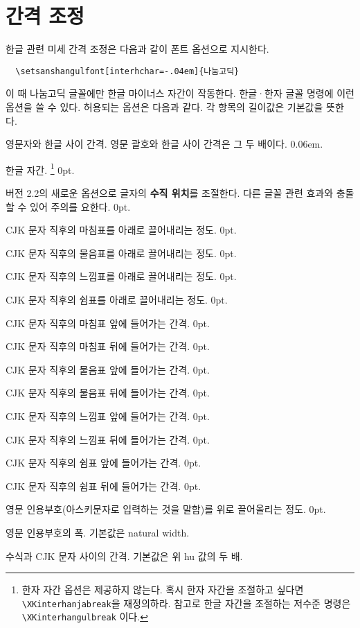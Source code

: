 \documentclass[a4paper]{article}
\def\cs#1{\texttt{\textbackslash #1}}
\def\hemph#1{\textsf{\bfseries #1}}
\def\hparen#1{{\small\hangulparens(#1)}}
\begin{document}
\section{간격 조정}
한글 관련 미세 간격 조정은 다음과 같이 폰트 옵션으로 지시한다.
\begin{verbatim}
  \setsanshangulfont[interhchar=-.04em]{나눔고딕}
\end{verbatim}
이 때 나눔고딕 글꼴에만 한글 마이너스 자간이 작동한다.
 한글·한자 글꼴
명령에 이런 옵션을 쓸 수 있다.
허용되는 옵션은 다음과 같다. 각 항목의 길이값은 기본값을 뜻한다.
\begin{description}\itemsep0pt
\item[hu]
  영문자와 한글 사이 간격. 영문 괄호와 한글 사이 간격은 그 두 배이다. 0.06em.
\item[interhchar]
  { 한글 자간.}%
  \footnote{한자 자간 옵션은 제공하지 않는다.
  혹시 한자 자간을 조절하고 싶다면 \cs{XKinterhanjabreak}을 재정의하라.
  참고로 한글 자간을 조절하는 저수준 명령은 \cs{XKinterhangulbreak} 이다.}
  0pt.
\item[charraise] 버전 2.2의 새로운 옵션으로
  글자의 \hemph{수직 위치}를 조절한다.
  다른 글꼴 관련 효과와 충돌할 수 있어 주의를 요한다. 0pt.
\item[lowerperiod]
  CJK 문자 직후의 마침표를 아래로 끌어내리는
  {정도. 0pt.}
\item[lowerquestion]
  CJK 문자 직후의 물음표를 아래로 끌어내리는 정도. 0pt.
\item[lowerexclamation]
  CJK 문자 직후의 느낌표를 아래로 끌어내리는 정도. 0pt.
\item[lowercomma]
  CJK 문자 직후의 쉼표를 아래로 끌어내리는 정도. 0pt.
\item[preperiodkern]
  {CJK 문자 직후의 마침표 앞에
  들어가는 간격. 0pt.}
\item[postperiodkern]
  {CJK 문자 직후의 마침표 뒤에
  들어가는 간격. 0pt.}
\item[prequestionkern]
  CJK 문자 직후의 물음표 앞에 들어가는 간격. 0pt.
\item[postquestionkern]
  CJK 문자 직후의 물음표 뒤에 들어가는 간격. 0pt.
\item[preexclamationkern]
  CJK 문자 직후의 느낌표 앞에 들어가는 간격. 0pt.
\item[postexclamationkern]
  CJK 문자 직후의 느낌표 뒤에 들어가는 간격. 0pt.
\item[precommakern]
  CJK 문자 직후의 쉼표 앞에 들어가는 간격. 0pt.
\item[postcommakern]
  CJK 문자 직후의 쉼표 뒤에 들어가는 간격. 0pt.
\item[quoteraise]
  영문 인용부호\hparen{아스키문자로 입력하는 것을 말함}를
  위로 끌어올리는 정도. 0pt.
\item[quotewidth]
  영문 인용부호의 폭. 기본값은 natural width.
\item[postmathskip]
  수식과 CJK 문자 사이의 간격.  기본값은 위 hu 값의 두 배.
\end{description}
\end{document}

